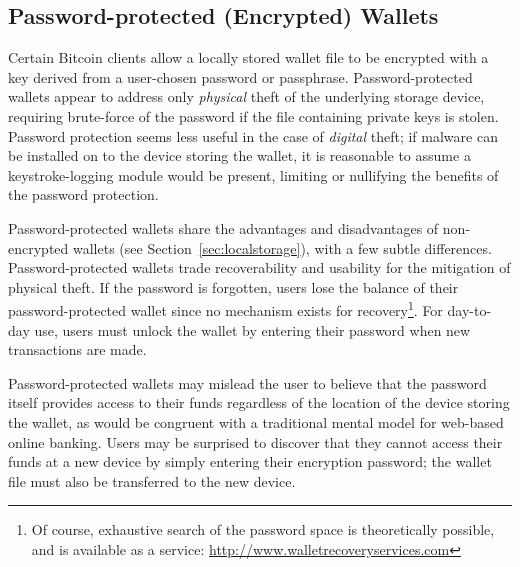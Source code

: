 \subsection{Password-protected (Encrypted) Wallets}
Certain Bitcoin clients allow a locally stored wallet file to be encrypted with a key derived from a user-chosen password or passphrase. 
Password-protected wallets appear to address only \emph{physical} theft of the underlying storage device, requiring brute-force of the password if the file containing private keys is stolen. Password protection seems less useful in the case of \emph{digital} theft; if malware can be installed on to the device storing the wallet, it is reasonable to assume a keystroke-logging module would be present, limiting or nullifying the benefits of the password protection.

Password-protected wallets share the advantages and disadvantages of non-encrypted wallets (see Section~\ref{sec:localstorage}), with a few subtle differences. Password-protected wallets trade recoverability and usability for the mitigation of physical theft. If the password is forgotten, users lose the balance of their password-protected wallet since no mechanism exists for recovery\footnote{Of course, exhaustive search of the password space is theoretically possible, and is available as a service: \url{http://www.walletrecoveryservices.com}}. For day-to-day use, users must unlock the wallet by entering their password when new transactions are made. 


Password-protected wallets may mislead the user to believe that the password itself provides access to their funds regardless of the location of the device storing the wallet, as would be congruent with a traditional mental model for web-based online banking. Users may be surprised to discover that they cannot access their funds at a new device by simply entering their encryption password; the wallet file must also be transferred to the new device. 

